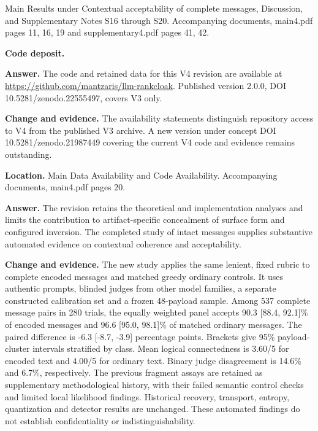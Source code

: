 \documentclass[11pt]{article}
\begin{document}
Main Results under Contextual acceptability of complete messages, Discussion, and Supplementary Notes S16 through S20. Accompanying documents, main4.pdf pages 11, 16, 19 and supplementary4.pdf pages 41, 42.


\textbf{Code deposit.}

\textbf{Answer.} The code and retained data for this V4 revision are available at \url{https://github.com/mantzaris/llm-rankcloak}. Published version 2.0.0, DOI 10.5281/zenodo.22555497, covers V3 only.

\textbf{Change and evidence.} The availability statements distinguish repository access to V4 from the published V3 archive. A new version under concept DOI 10.5281/zenodo.21987449 covering the current V4 code and evidence remains outstanding.

\textbf{Location.} Main Data Availability and Code Availability. Accompanying documents, main4.pdf pages 20.




\textbf{Answer.} The revision retains the theoretical and implementation analyses and limits the contribution to artifact-specific concealment of surface form and configured inversion. The completed study of intact messages supplies substantive automated evidence on contextual coherence and acceptability.

\textbf{Change and evidence.} The new study applies the same lenient, fixed rubric to complete encoded messages and matched greedy ordinary controls. It uses authentic prompts, blinded judges from other model families, a separate constructed calibration set and a frozen 48-payload sample. Among 537 complete message pairs in 280 trials, the equally weighted panel accepts 90.3 [88.4, 92.1]\% of encoded messages and 96.6 [95.0, 98.1]\% of matched ordinary messages. The paired difference is -6.3 [-8.7, -3.9] percentage points. Brackets give 95\% payload-cluster intervals stratified by class. Mean logical connectedness is 3.60/5 for encoded text and 4.00/5 for ordinary text. Binary judge disagreement is 14.6\% and 6.7\%, respectively. The previous fragment assays are retained as supplementary methodological history, with their failed semantic control checks and limited local likelihood findings. Historical recovery, transport, entropy, quantization and detector results are unchanged. These automated findings do not establish confidentiality or indistinguishability.
\end{document}
